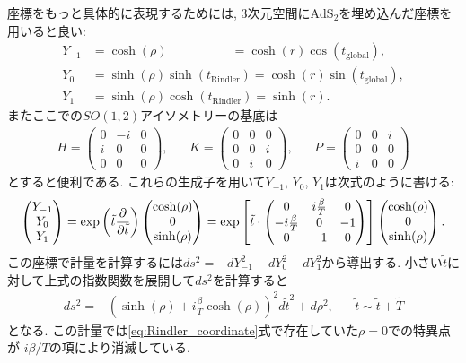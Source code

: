 座標をもっと具体的に表現するためには, 3次元空間に$\mathrm{AdS}_2$を埋め込んだ座標を用いると良い:
\begin{align}
	Y_{-1} &= \cosh(\rho) \hspace{61pt} = \cosh(r)\cos(t_{\mathrm{global}}),\nonumber\\
	Y_0    &= \sinh(\rho)\sinh(t_{\mathrm{Rindler}}) = \cosh(r)\sin(t_{\mathrm{global}}),\\
	Y_1    &= \sinh(\rho)\cosh(t_{\mathrm{Rindler}}) = \sinh(r)\nonumber.
\end{align}
またここでの$SO(1,2)$アイソメトリーの基底は
\begin{align}
	H = \begin{pmatrix}
		0 & -i & 0\\
		i & 0 & 0\\
		0 & 0 & 0
	\end{pmatrix},\hspace{20pt}
	K = \begin{pmatrix}
		0 & 0 & 0\\
		0 & 0 & i\\
		0 & i & 0
	\end{pmatrix},\hspace{20pt}
	P = \begin{pmatrix}
		0 & 0 & i\\
		0 & 0 & 0\\
		i & 0 & 0
	\end{pmatrix}
\end{align}
とすると便利である. 
これらの生成子を用いて$Y_{-1}$, $Y_0$, $Y_1$は次式のように書ける:
\begin{align}
	\begin{pmatrix} Y_{-1} \\ Y_0 \\ Y_1 \end{pmatrix}
	= \exp\left(\tilde{t}\frac{\partial}{\partial \tilde{t}}\right)\begin{pmatrix} \cosh(\rho) \\ 0 \\ \sinh(\rho) \end{pmatrix}
	= \exp\left[
		\tilde{t}\cdot\begin{pmatrix}
			0 & i\frac{\beta}{T} & 0\\
			-i\frac{\beta}{T} & 0 & -1\\
			0 & -1 & 0
		\end{pmatrix}
	\right]\begin{pmatrix} \cosh(\rho) \\ 0 \\ \sinh(\rho) \end{pmatrix}.
\end{align}
この座標で計量を計算するには$ds^2 = -dY_{-1}^2 - dY_0^2 + dY_1^2$から導出する. 
小さい$\tilde{t}$に対して上式の指数関数を展開して$ds^2$を計算すると
\begin{align}
	ds^2
	= -\left(\sinh(\rho) + i\frac{\beta}{T}\cosh(\rho)\right)^2d\tilde{t}^2
		+ d\rho^2,\hspace{20pt}\tilde{t}\sim\tilde{t} + \tilde{T}
	\label{eq:embedded_metric}
\end{align}
となる. 
この計量では\eqref{eq:Rindler_coordinate}式で存在していた$\rho=0$での特異点が
$i\beta / T$の項により消滅している. 


